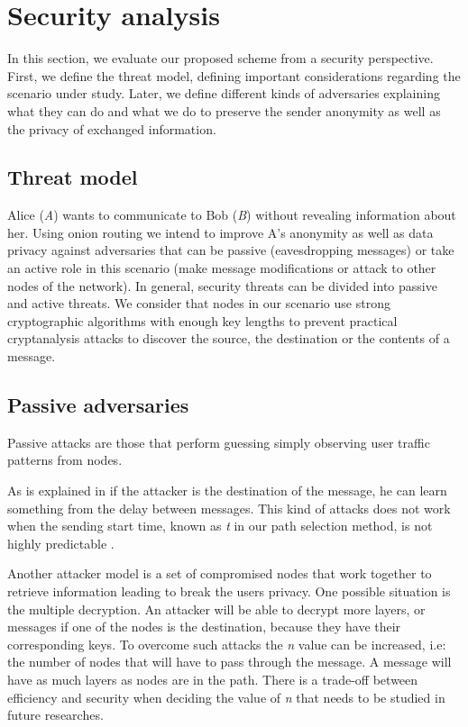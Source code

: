 \section{Security analysis}\label{sec:sanalysis}


In this section, we evaluate our proposed scheme from a security perspective. First, we define the threat model, defining important considerations regarding the scenario under study. Later, we define different kinds of adversaries explaining what they can do and what we do to preserve the sender anonymity as well as the privacy of exchanged information.

\subsection{Threat model}

Alice (\textit{A}) wants to communicate to Bob (\textit{B}) without revealing information about her. Using onion routing we intend to improve A's anonymity as well as data privacy against adversaries that can be passive (eavesdropping messages) or take an active role in this scenario (make message modifications or attack to other nodes of the network). In general, security threats can be divided into passive and active threats. We consider that nodes in our scenario use strong cryptographic algorithms with enough key lengths to prevent practical cryptanalysis attacks to discover the source, the destination or the contents of a message. 

\subsection{Passive adversaries}

Passive attacks are those that perform guessing simply observing user traffic patterns from nodes. 

As is explained in \cite{latency-leak} if the attacker is the destination of the message, he can learn something from the delay between messages.  This kind of attacks does not work when the sending start time, known as \textit{t} in our path selection method, is not highly predictable \cite{enpassant}.

Another attacker model is a set of compromised nodes that work together to retrieve information leading to break the users privacy. One possible situation is the multiple decryption. An attacker will be able to decrypt more layers, or messages if one of the nodes is the destination, because they have their corresponding keys. To overcome such attacks the \textit{n} value can be increased, i.e: the number of nodes that will have to pass through the message. A message will have as much layers as nodes are in the path. There is a trade-off between efficiency and security when deciding the value of \textit{n} that needs to be studied in future researches. 

